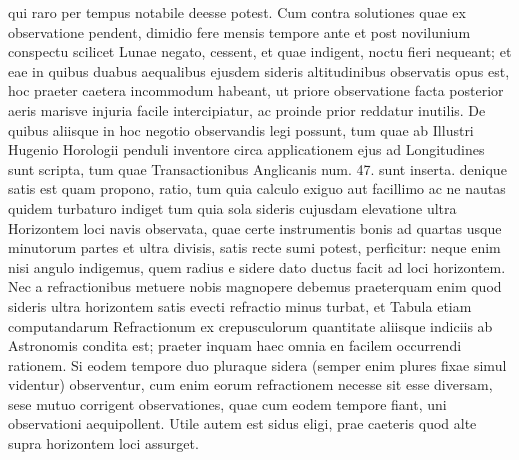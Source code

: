  qui raro per tempus notabile deesse potest. Cum contra solutiones quae ex \protect{} observatione pendent, dimidio fere mensis tempore ante et post novilunium conspectu scilicet Lunae\protect{} negato, cessent, et quae indigent, noctu fieri nequeant; et eae in quibus duabus aequalibus ejusdem sideris altitudinibus\protect{} observatis opus est, hoc praeter caetera incommodum habeant, ut priore observatione facta posterior aeris marisve injuria facile intercipiatur, ac proinde prior reddatur inutilis. De quibus aliisque in hoc negotio observandis legi possunt, tum quae ab Illustri Hugenio\protect{} Horologii penduli\protect{} inventore circa applicationem ejus ad Longitudines\protect{} sunt scripta,  tum quae Transactionibus Anglicanis num. 47. sunt inserta.  denique satis est quam propono, ratio, tum quia calculo exiguo aut facillimo ac ne nautas quidem turbaturo indiget tum quia sola sideris\protect{} cujusdam elevatione ultra Horizontem loci navis\protect{} observata, quae certe instrumentis bonis ad quartas usque minutorum partes et ultra divisis, satis recte sumi potest, perficitur: neque enim nisi angulo indigemus, quem radius e sidere\protect{} dato ductus facit ad loci horizontem. Nec a refractionibus\protect{} metuere nobis magnopere debemus praeterquam enim quod sideris\protect{} ultra horizontem satis evecti refractio\protect{} minus turbat, et Tabula etiam computandarum Refractionum\protect{} ex crepusculorum quantitate aliisque indiciis ab Astronomis condita est; praeter inquam haec omnia en facilem occurrendi rationem. Si eodem tempore duo pluraque sidera\protect{} (semper enim plures fixae\protect{} simul videntur) observentur, cum enim eorum refractionem\protect{} necesse sit esse diversam, sese mutuo corrigent observationes, quae cum eodem tempore fiant, uni observationi aequipollent. Utile autem est sidus\protect{} eligi, prae caeteris quod alte supra horizontem loci assurget.      

